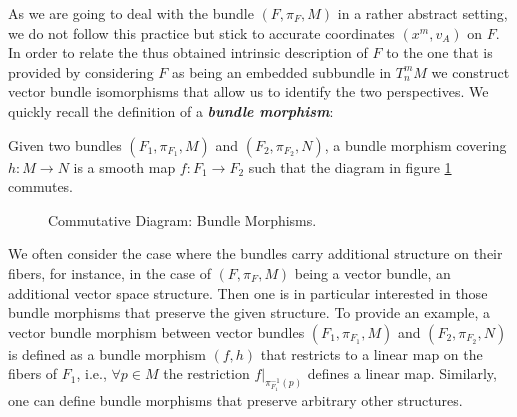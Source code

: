 As we are going to deal with the bundle $(F, \pi_F, M)$ in a rather abstract setting, we do not follow this practice but stick to accurate coordinates $(x^m,v_A)$ on $F$. 
In order to relate the thus obtained intrinsic description of $F$ to the one that is provided by considering $F$ as being an embedded subbundle in $T^m_n M$ we construct vector bundle isomorphisms that allow us to identify the two perspectives. We quickly recall the definition of a \textit{\textbf{bundle morphism}}:
\begin{definition}
Given two bundles $(F_1, \pi_{F_1}, M)$ and $(F_2, \pi_{F_2}, N)$, a bundle morphism covering $h : M \rightarrow N$ is a smooth map $f : F_1 \rightarrow F_2$ such that the diagram in figure \ref{BundleMorph} commutes.
\begin{figure}[hbt!]
\centering 
{}
\caption{Commutative Diagram: Bundle Morphisms.}\label{BundleMorph}
\end{figure}
\end{definition}
\begin{comment}
\begin{remark}
We normally denote a bundle morphism $f$ that covers $h$ as pair $(f,h)$. For the special case $M=N$ and $h=\operatorname{id}_M$ we shorten the notation to simply $f$. Also we might refer to a bundle morphism by the total space function $f$ if $f$ and $h$ are related via some specified construction, i.e., if $f$ can be obtained uniquely once $h$ is given. 
\end{remark}
\end{comment}
We often consider the case where the bundles carry additional structure on their fibers, for instance, in the case of $(F, \pi_F, M)$ being a vector bundle, an additional vector space structure. Then one is in particular interested in those bundle morphisms that preserve the given structure. To provide an example, a vector bundle morphism between vector bundles $(F_1, \pi_{F_1}, M)$ and $(F_2, \pi_{F_2}, N)$ is defined as a bundle morphism $(f,h)$ that restricts to a linear map on the fibers of $F_1$, i.e., $\forall p \in M$ the restriction $f \vert_{\pi_{F_1}^{-1}(p)}$ defines a linear map.
Similarly, one can define bundle morphisms that preserve arbitrary other structures.

